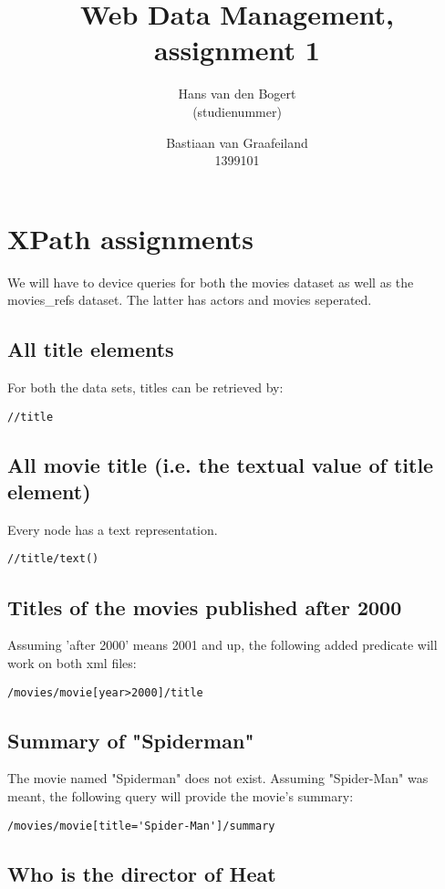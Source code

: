 \documentclass{article}
\title{Web Data Management, assignment 1}
\author{Hans van den Bogert\\(studienummer) \and Bastiaan van Graafeiland\\1399101}
\begin{document}
\maketitle

\section{XPath assignments}
We will have to device queries for both the movies dataset as well as the movies\_refs dataset. The latter has actors and movies seperated.

\subsection{All title elements}
For both the data sets, titles can be retrieved by:
\begin{verbatim}
//title
\end{verbatim}

\subsection{All movie title (i.e. the textual value of title element)}
Every node has a text representation.
\begin{verbatim}
//title/text()
\end{verbatim}

\subsection{Titles of the movies published after 2000}
Assuming 'after 2000' means 2001 and up, the following added predicate will work on both xml files:
\begin{verbatim}
/movies/movie[year>2000]/title
\end{verbatim}

\subsection{Summary of "Spiderman"}
The movie named "Spiderman" does not exist. Assuming "Spider-Man" was meant, the following query will provide the movie's summary:
\begin{verbatim}
/movies/movie[title='Spider-Man']/summary
\end{verbatim}

\subsection{Who is the director of Heat}
\end{document}
